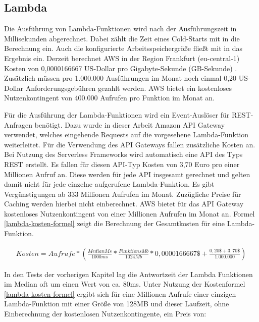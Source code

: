 \subsection{Lambda}
\label{subsec:kosten-lambda}
Die Ausführung von Lambda-Funktionen wird nach der Ausführungszeit in Millisekunden abgerechnet. Dabei zählt die Zeit eines Cold-Starts mit in die Berechnung ein. Auch die konfigurierte Arbeitsspeichergröße fließt mit in das Ergebnis ein. Derzeit berechnet AWS in der Region Frankfurt (eu-central-1) Kosten von 0,0000166667 US-Dollar pro Gigabyte-Sekunde (GB-Sekunde) \cite{noauthor_lambda_nodate}. Zusätzlich müssen pro 1.000.000 Ausführungen im Monat noch einmal 0,20 US-Dollar Anforderungsgebühren gezahlt werden. AWS bietet ein kostenloses Nutzenkontingent von 400.000 Aufrufen pro Funktion im Monat an.

Für die Ausführung der Lambda-Funktionen wird ein Event-Auslöser für REST-Anfragen benötigt. Dazu wurde in dieser Arbeit Amazon API Gateway verwendet, welches eingehende Requests auf die vorgesehene Lambda-Funktion weiterleitet. Für die Verwendung des API Gateways fallen zusätzliche Kosten an. Bei Nutzung des Serverless Frameworks wird automatisch eine API des Typs REST erstellt. Es fallen für diesen API-Typ Kosten von 3,70 Euro pro einer Millionen Aufruf an. Diese werden für jede API insgesamt gerechnet und gelten damit nicht für jede einzelne aufgerufene Lambda-Funktion. Es gibt Vergünstigungen ab 333 Millionen Aufrufen im Monat. Zuzügliche Preise für Caching werden hierbei nicht einberechnet. AWS bietet für das API Gateway kostenloses Nutzenkontingent von einer Millionen Aufrufen im Monat an\cite{noauthor_amazon_nodate}. Formel \ref{lambda-kosten-formel} zeigt die Berechnung der Gesamtkosten für eine Lambda-Funktion.

\begin{equation}
\begin{split}
Kosten = Aufrufe * \left(\frac{MedianMs}{1000ms} * \frac{FunktionsMb}{1024Mb} * 0,0000166667\$ + \frac{0,20\$ + 3,70\$}{1.000.000}\right)
\end{split}
\label{lambda-kosten-formel}
\end{equation}

In den Tests der vorherigen Kapitel lag die Antwortzeit der Lambda Funktionen im Median oft um einen Wert von ca. 80ms. Unter Nutzung der Kostenformel \ref{lambda-kosten-formel} ergibt sich für eine Millionen Aufrufe einer einzigen Lambda-Funktion mit einer Größe von 128MB und dieser Laufzeit, ohne Einberechnung der kostenlosen Nutzenkontingente, ein Preis von: \\


